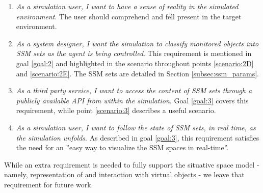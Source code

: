 \begin{enumerate}
	\item[\textlabel{5.}{us:5}] \emph{As a simulation user, I want to have a sense of reality in the simulated environment}. The user should comprehend and fell present in the target environment.

	\item[\textlabel{6.}{us:6}] \emph{As a system designer, I want the simulation to classify monitored objects into SSM sets as the agent is being controlled}. This requirement is mentioned in goal \ref{goal:2} and highlighted in the scenario throughout points \ref{scenario:2D} and \ref{scenario:2E}. The SSM sets are detailed in Section \ref{subsec:ssm_params}.

	\item[\textlabel{7.}{us:7}] \emph{As a third party service, I want to access the content of SSM sets through a publicly available API from within the simulation}. Goal \ref{goal:3} covers this requirement, while point \ref{scenario:3} describes a useful scenario.

	\item[\textlabel{8.}{us:8}] \emph{As a simulation user, I want to follow the state of SSM sets, in real time, as the simulation unfolds}. As described in goal \ref{goal:3}, this requirement satisfies the need for an ''easy way to visualize the SSM spaces in real-time''.

\end{enumerate}

While an extra requirement is needed to fully support the situative space model - namely, representation of and interaction with virtual objects - we leave that requirement for future work.\\

